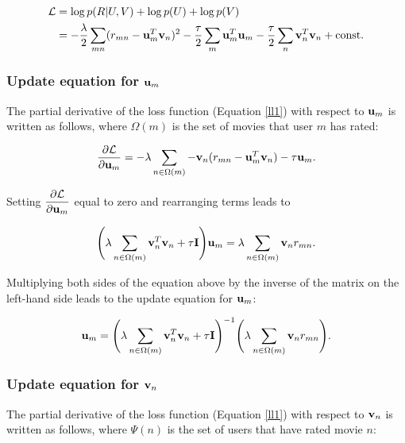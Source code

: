\documentclass{article}
\begin{document}
\begin{equation} \label{ll1}
    \begin{split}
    \mathcal{L} & = \log{p(R|U,V)} + \log{p(U)} + \log{p(V)} \\
                & = -\dfrac{\lambda}{2} \sum\limits_{mn} (r_{mn} - \vb{u}_{m}^{T} \vb{v}_{n})^2 - \dfrac{\tau}{2} \sum\limits_{m} \vb{u}_{m}^{T} \vb{u}_{m} - \dfrac{\tau}{2} \sum\limits_{n} \vb{v}_{n}^{T} \vb{v}_{n} + \text{const}\text{.}
    \end{split}
\end{equation}

\subsubsection{Update equation for $\vb{u}_{m}$}

The partial derivative of the loss function (Equation \ref{ll1}) with respect to $\vb{u}_{m}$ is written as follows,
where $\Omega(m)$ is the set of movies that user $m$ has rated:

\[
    \dfrac{\partial \mathcal{L}}{\partial \vb{u}_m} 
    = -\lambda \sum\limits_{n \in \Omega(m)} -\vb{v}_{n}(r_{mn} - \vb{u}_{m}^{T} \vb{v}_{n}) - \tau \vb{u}_{m}\text{.}
\]

Setting $\dfrac{\partial \mathcal{L}}{\partial \vb{u}_m}$ equal to zero and rearranging terms leads to

\[
    \Bigg(\lambda \sum\limits_{n \in \Omega(m)} \vb{v}_{n}^{T}\vb{v}_{n} + \tau \vb{I} \Bigg)\vb{u}_m
    = \lambda \sum\limits_{n \in \Omega(m)} \vb{v}_{n} r_{mn}\text{.}
\]

Multiplying both sides of the equation above by the inverse of the matrix on the left-hand side leads to the update equation for $\vb{u}_m$:

\begin{equation} \label{u_1}
    \begin{split}
        \vb{u}_m = \Bigg(\lambda \sum\limits_{n \in \Omega(m)} \vb{v}_{n}^{T}\vb{v}_{n} + \tau \vb{I} \Bigg)^{-1}
        \Bigg(\lambda \sum\limits_{n \in \Omega(m)} \vb{v}_{n} r_{mn}\Bigg)\text{.}
    \end{split}
\end{equation}

\subsubsection{Update equation for $\vb{v}_{n}$}

The partial derivative of the loss function (Equation \ref{ll1}) with respect to $\vb{v}_{n}$ is written as follows,
where $\Psi(n)$ is the set of users that have rated movie $n$:
\end{document}
